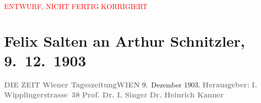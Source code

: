 
\begin{center}
            \textcolor{red}{ENTWURF, NICHT FERTIG KORRIGIERT}
                      \end{center}
            
         
         \renewcommand{\erwaehntePersonen}{Personen: Heinrich Kanner, Paul Schlenther, Isidor Singer}
         \renewcommand{\erwaehnteInstitutionen}{Institutionen: Die Zeit}
         \renewcommand{\erwaehnteOrte}{Orte: Wien, Wipplingerstraße}
         \renewcommand{\erwaehnteWerke}{Werke: Der Schleier der Beatrice. Schauspiel in fünf Akten, Die Zeit, Erklärung [Schleier der Beatrice]}
               \section[Felix Salten an Arthur Schnitzler, 9. 12. 1903]{ Felix Salten an Arthur Schnitzler, 9. 12. 1903}\nopagebreak{}\rehead{ }\begin{ledgroupsized}[t]{13cm}\normalsize\beginnumbering \toendnotes[C]{\smallbreak\pagebreak[2]} 
\toendnotes[C]{\smallbreak}\pstart
           \noindent{}{\pb}\textcolor{gray}{\textbf{DIE}}\pend
           \pstart
           \textcolor{gray}{\textbf{ZEIT}}\pend
           \pstart
           \textcolor{gray}{\textbf{Wiener Tageszeitung}}\hfill \textcolor{gray}{\textbf{WIEN}}{ }9. Dezember 1903. \pend
           \pstart
           \textcolor{gray}{\textbf{Herausgeber: }}\hfill \textcolor{gray}{\textbf{I. Wipplingerstrasse 38}}\pend
           \pstart
           \textcolor{gray}{\textbf{Prof. Dr. I. Singer}}\pend
           \pstart
           \textcolor{gray}{\textbf{Dr. Heinrich Kanner}}\pend
           \pstart

\end{ledgroupsized}
